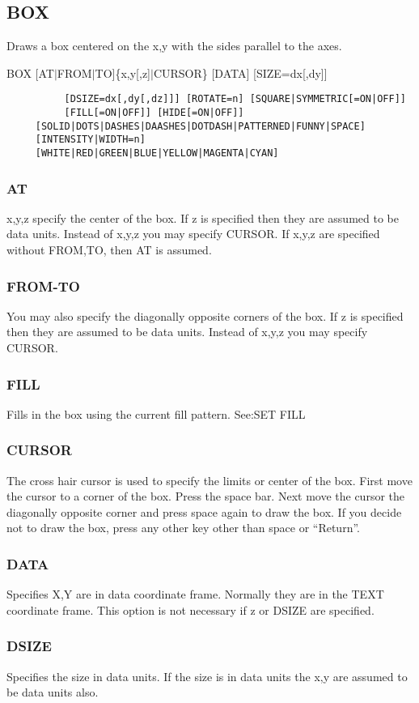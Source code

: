 \subsection{BOX}
Draws a box centered on the x,y with the sides parallel to the axes.  

BOX [AT$|$FROM$|$TO]\{x,y[,z]$|$CURSOR\} [DATA] [SIZE=dx[,dy]]
\begin{verbatim}
          [DSIZE=dx[,dy[,dz]]] [ROTATE=n] [SQUARE|SYMMETRIC[=ON|OFF]]
          [FILL[=ON|OFF]] [HIDE[=ON|OFF]] 
     [SOLID|DOTS|DASHES|DAASHES|DOTDASH|PATTERNED|FUNNY|SPACE] 
     [INTENSITY|WIDTH=n] 
     [WHITE|RED|GREEN|BLUE|YELLOW|MAGENTA|CYAN] 
\end{verbatim}
\subsubsection{AT}
x,y,z  specify  the center of the box.  If z is specified then they are
assumed to be data units.  Instead of x,y,z you may specify CURSOR.  If
x,y,z are specified without FROM,TO, then AT is assumed.  
\subsubsection{FROM-TO}
You  may also specify the diagonally opposite corners of the box.  If z
is specified then they are assumed to be data units.  Instead of  x,y,z
you may specify CURSOR.  
\subsubsection{FILL}
Fills in the box using the current fill pattern.  See:SET FILL 
\subsubsection{CURSOR}
The  cross  hair  cursor is used to specify the limits or center of the
box.  First move the cursor to a corner of the box.   Press  the  space
bar.   Next  move  the  cursor the diagonally opposite corner and press
space again to draw the box.  If you decide not to draw the box,  press
any other key other than space or ``Return''.  
\subsubsection{DATA}
Specifies  X,Y  are in data coordinate frame.  Normally they are in the
TEXT coordinate frame.  This option is not necessary if z or DSIZE  are
specified.  
\subsubsection{DSIZE}
Specifies the size in data units.  If the size is in data units the x,y
are assumed to be data units also.  
